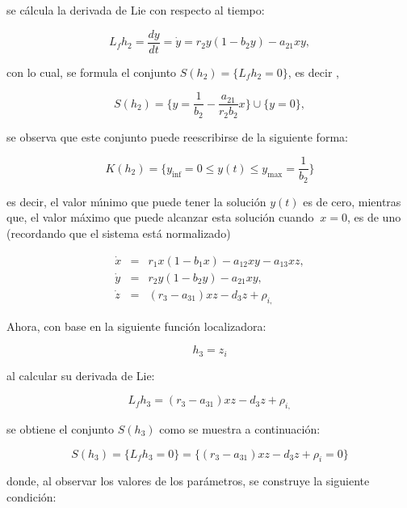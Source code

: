 \documentclass[letterpaper,11pt]{article}
\begin{document}
se c\'{a}lcula la derivada de Lie con respecto al tiempo:

\begin{equation*}
L_{f}h_{2}=\frac{dy}{dt}=\dot{y}=r_{2}y(1-b_{2}y)-a_{21}xy,
\end{equation*}

con lo cual, se formula el conjunto $S(h_{2})=\{L_{f}h_{2}=0\}$, es decir ,

\begin{equation*}
S(h_{2})=\{y=\frac{1}{b_{2}}-\frac{a_{21}}{r_{2}b_{2}}x\}\cup \{y=0\},
\end{equation*}

se observa que este conjunto puede reescribirse de la siguiente forma:

\begin{equation*}
K(h_{2})=\{y_{\inf }=0\leq y(t)\leq y_{\max }=\frac{1}{b_{2}}\}
\end{equation*}

es decir, el valor m\'{\i}nimo que puede tener la soluci\'{o}n $y(t)$ es de
cero, mientras que, el valor m\'{a}ximo que puede alcanzar esta soluci\'{o}n
cuando $\ x=0$, es de uno (recordando que el sistema est\'{a} normalizado)

\begin{eqnarray*}
\dot{x} &=&r_{1}x(1-b_{1}x)-a_{12}xy-a_{13}xz, \\
\dot{y} &=&r_{2}y(1-b_{2}y)-a_{21}xy, \\
\dot{z} &=&(r_{3}-a_{31})xz-d_{3}z+\rho _{i,}
\end{eqnarray*}

\bigskip

\bigskip Ahora, con base en la siguiente funci\'{o}n localizadora:

\begin{equation*}
h_{3}=z_{i}
\end{equation*}

al calcular su derivada de Lie:

\begin{equation*}
L_{f}h_{3}=\left( r_{3}-a_{31}\right) xz-d_{3}z+\rho _{i,}
\end{equation*}

se obtiene el conjunto $S(h_{3})$ como se muestra a continuaci\'{o}n:

\begin{equation*}
S(h_{3})=\{L_{f}h_{3}=0\}=\{\left( r_{3}-a_{31}\right) xz-d_{3}z+\rho
_{i}=0\}
\end{equation*}

donde, al observar los valores de los par\'{a}metros, se construye la
siguiente condici\'{o}n:
\end{document}
